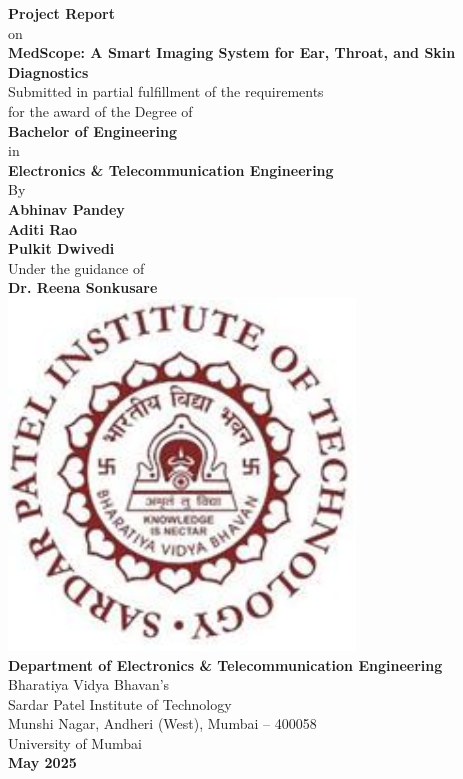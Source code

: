 \begin{titlepage}
\centering
\vspace*{0.5cm}

{\Large\bfseries Project Report}\\[0.3cm]
{\large on}\\[0.3cm]
{\LARGE\bfseries MedScope: A Smart Imaging System for Ear, Throat, and Skin Diagnostics}\\[0.7cm]

{\large Submitted in partial fulfillment of the requirements\\
for the award of the Degree of}\\[0.5cm]

{\Large\bfseries Bachelor of Engineering}\\[0.3cm]
{\large in}\\[0.3cm]
{\large\bfseries Electronics \& Telecommunication Engineering}\\[0.5cm]

{\large By}\\[0.3cm]
{\normalsize\bfseries Abhinav Pandey\\
Aditi Rao\\
Pulkit Dwivedi}\\[0.5cm]

{\large Under the guidance of}\\[0.3cm]
{\normalsize\bfseries Dr. Reena Sonkusare}\\[0.5cm]

\includegraphics[scale=0.7]{spitlogo.pdf}\\[0.5cm]

{\bfseries Department of Electronics \& Telecommunication Engineering}\\
Bharatiya Vidya Bhavan's\\
Sardar Patel Institute of Technology\\
Munshi Nagar, Andheri (West), Mumbai – 400058\\
University of Mumbai\\[0.5cm]

{\large\bfseries May 2025}
\end{titlepage}
